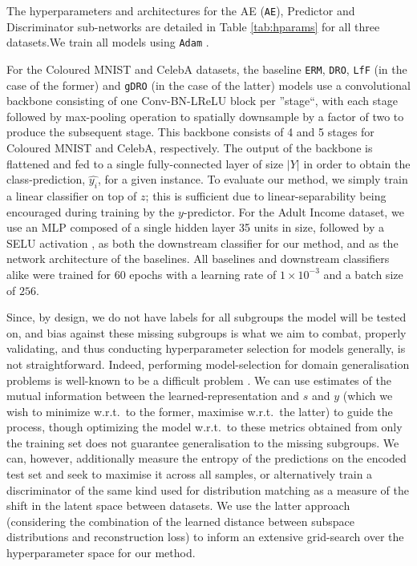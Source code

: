 The hyperparameters and architectures for the \acf{AE} (\texttt{AE}), Predictor and Discriminator
sub-networks are detailed in Table \ref{tab:hparams} for all three datasets.We train all models
using \texttt{Adam} \cite{KinBa15}.

For the Coloured MNIST and CelebA datasets, the baseline \texttt{ERM}, \texttt{DRO}, \texttt{LfF}
(in the case of the former) and \texttt{gDRO} (in the case of the latter) models use a
convolutional backbone consisting of one Conv-BN-LReLU block per ''stage``, with each stage
followed by max-pooling operation to spatially downsample by a factor of two to produce the
subsequent stage. This backbone consists of 4 and 5 stages for Coloured MNIST and CelebA,
respectively. The output of the backbone is flattened and fed to a  single fully-connected layer of
size $|Y|$ in order to obtain the class-prediction, $\hat{y_i}$, for a given instance. To evaluate
our method, we simply train a linear classifier on top of $z$; this is sufficient due to
linear-separability being encouraged during training by the $y$-predictor. For the Adult Income
dataset, we use an \ac{MLP} composed of a single hidden layer 35 units in size, followed by a SELU
activation \cite{klambauer2017self}, as both the downstream classifier for our method, and as the
network architecture of the baselines. All baselines and downstream classifiers alike were trained
for $60$ epochs with a learning rate of $1 \times 10^{-3}$ and a batch size of $256$.

Since, by design, we do not have labels for all subgroups the model will be tested on, and bias
against these missing subgroups is what we aim to combat, properly validating, and thus conducting
hyperparameter selection for models generally, is not straightforward. Indeed, performing
model-selection for domain generalisation problems is well-known to be a difficult problem
\cite{gulrajani2021search}. We can use estimates of the mutual information between the
learned-representation and $s$ and $y$ (which we wish to minimize w.r.t.\ to the former, maximise
w.r.t.\ the latter) to guide the process, though optimizing the model w.r.t.\ to these metrics
obtained from only the training set does not guarantee generalisation to the missing subgroups. We
can, however, additionally measure the entropy of the predictions on the encoded test set and seek
to maximise it across all samples, or alternatively train a discriminator of the same kind used for
distribution matching as a measure of the shift in the latent space between datasets. We use the
latter approach (considering the combination of the learned distance between subspace distributions
and reconstruction loss) to inform an extensive grid-search over the hyperparameter space for our
method.

